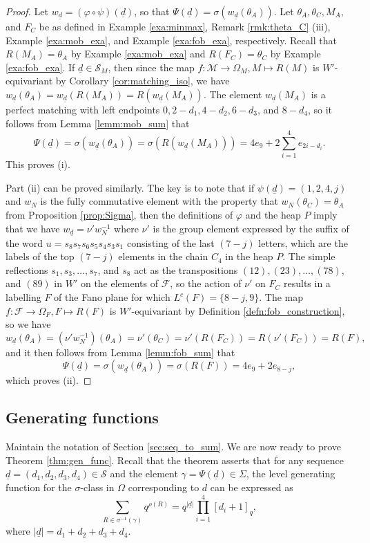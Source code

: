 \documentclass[11pt]{amsart}
\theoremstyle{plain}
\theoremstyle{definition}
\theoremstyle{remark}
\numberwithin{equation}{section}
\newcommand{\ra}{\rightarrow}
\newcommand{\lc}{L^c}
\newcommand{\wnn}{w_{N}}
\newcommand{\seqd}{\underline{d}}
\newcommand{\calf}{\mathcal{F}}
\newcommand{\calm}{\mathcal{M}}
\newcommand{\cals}{\mathcal{S}}
\newcommand{\ob}{\Omega}
\newcommand{\fob}{\Omega_F}
\newcommand{\mob}{\Omega_M}
\newcommand{\inverse}{^{-1}}
\newcommand{\abs}[1]{\lvert #1 \rvert}
\begin{document}
\begin{proof}
  Let $w_{\seqd}=(\varphi\circ \psi)(\seqd)$, so that
  $\Psi(\seqd)=\sigma(w_{\seqd}(\theta_A))$. Let $\theta_A, \theta_C, M_A,$ and
  $F_C$ be as defined in Example \ref{exa:minmax}, Remark \ref{rmk:theta_C}
  (iii), Example \ref{exa:mob_exa}, and Example \ref{exa:fob_exa}, respectively.
  Recall that $R(M_A)=\theta_A$ by Example \ref{exa:mob_exa} and
  $R(F_C)=\theta_C$ by  Example \ref{exa:fob_exa}. 
%
  If $\seqd\in \cals_M$, then since the map $f:\calm\ra \mob, M\mapsto R(M)$ is
  $W'$-equivariant by Corollary \ref{cor:matching_iso}, we have
  $w_{\seqd}(\theta_A)=w_{\seqd}(R(M_A))=R(w_{\seqd}(M_A))$. The element
  $w_{\seqd}(M_A)$ is a perfect
  matching with left endpoints $0, 2-d_1, 4-d_2, 6-d_3$, and $8-d_4$, so it
  follows from Lemma \ref{lemm:mob_sum} that \[
    \Psi(\seqd)=\sigma(w_{\seqd}(\theta_A))=\sigma(R(w_{\seqd}(M_A)))= 4e_9+2\sum_{i=1}^4
e_{2i-d_i}. \] This proves (i). 

Part (ii) can be proved similarly. The key is to note that if
$\psi(\seqd)=(1,2,4,j)$ and $\wnn$ is the fully commutative element with the property that
$\wnn(\theta_C)=\theta_A$ from Proposition \ref{prop:Sigma}, then the definitions of
$\varphi$ and the heap $P$ imply that we have $w_{\seqd}=\nu'\wnn\inverse$ where $\nu'$
is the group element expressed by the suffix of the word $u={s_8s_7s_6s_5s_4s_3s_1}$
consisting of the last $(7-j)$ letters, which are the labels of the top $(7-j)$
elements in the chain $C_4$ in the heap $P$. The simple reflections $s_1, s_3,
\dots, s_7$, and $s_8$ act as the transpositions $(12), (23), \dots, (78)$, and
$(89)$ in $W'$ on the elements of $\calf$, so the action of $\nu'$ 
on $F_C$ results in a labelling $F$ of the Fano plane for which
$\lc(F)=\{8-j,9\}$. The map $f:\calf\ra \fob, F\mapsto R(F)$ is $W'$-equivariant
by Definition \ref{defn:fob_construction}, so we have 
\[
  w_{\seqd}(\theta_A)=(\nu'\wnn\inverse)(\theta_A)=\nu'(\theta_C)=\nu'(R(F_C))=R(\nu'(F_C))=R(F),
\]
and it then follows from Lemma \ref{lemm:fob_sum} that 
\[
  \Psi(\seqd)=\sigma(w_{\seqd}(\theta_A))=\sigma(R(F))=4e_9+2e_{8-j},
\]
which proves (ii).
\end{proof}


\subsection{Generating functions}
\label{sec:gen_func}

Maintain the notation of Section \ref{sec:seq_to_sum}.  We are now ready to
prove Theorem \ref{thm:gen_func}. Recall that the theorem asserts that for any
sequence  $\seqd=(d_1,d_2,d_3,d_4)\in \cals$ and the element $\gamma=\Psi(\seqd)\in
\Sigma$, the level generating function for the $\sigma$-class in $\ob$
corresponding to $d$ can be expressed as
\begin{equation} \label{eq:seq_to_gen} \sum_{R\in
\sigma\inverse(\gamma)}q^{\rho(R)}=q^{\abs{\seqd}}\prod_{i=1}^4 [d_i+1]_q,
\end{equation}
where $\abs{\seqd}=d_1+d_2+d_3+d_4$.
\end{document}
